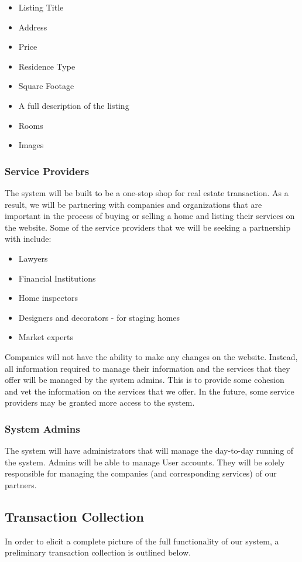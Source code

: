 \documentclass[12pt,a4paper]{report}
\begin{document}
\begin{itemize} 
\item Listing Title
\item Address
\item Price
\item Residence Type
\item Square Footage
\item A full description of the listing
\item Rooms 
\item Images
\end{itemize}

\subsubsection{Service Providers}
The system will be built to be a one-stop shop for real estate transaction. As a result, we will be partnering with companies and organizations that are important in the process of buying or selling a home and listing their services on the website. Some of the service providers that we will be seeking a partnership with include:

\begin{itemize} 
\item Lawyers
\item Financial Institutions 
\item Home inspectors
\item Designers and decorators - for staging homes 
\item Market experts 
\end{itemize}

Companies will not have the ability to make any changes on the website. Instead, all information required to manage their information and the services that they offer will be managed by the system admins. This is to provide some cohesion and vet the information on the services that we offer. In the future, some service providers may be granted more access to the system. 

\subsubsection{System Admins}
The system will have administrators that will manage the day-to-day running of the system. Admins will be able to manage User accounts. They will be solely responsible for managing the companies (and corresponding services) of our partners.

\subsection{Transaction Collection}
In order to elicit a complete picture of the full functionality of our system, a preliminary transaction collection is outlined below.
\end{document}

